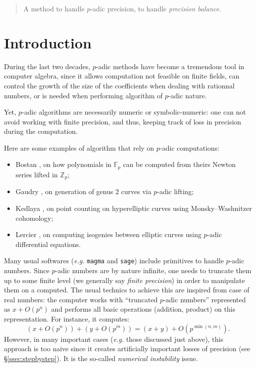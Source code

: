 \documentclass{amsart}
\begin{document}
\date{november 2013}

\maketitle
\begin{abstract}
A method to handle $p$-adic precision, to handle \textit{precision balance}.
\end{abstract}




\section{Introduction}

During the last two decades, $p$-adic methods have become a tremendous tool in computer algebra, since it allows computation not feasible on finite fields, can control the growth of the size of the coefficients when dealing with rationnal numbers, or is needed when performing algorithm of $p$-adic nature.

Yet, $p$-adic algorithms are necessarily numeric or symbolic-numeric: one can not avoid working with finite precision, and thus, keeping track of loss in precision during the computation.

Here are some examples of algorithm that rely on $p$-adic computations:
\begin{itemize}
\item Bostan \cite{Bostan}, on how polynomials in $\mathbb{F}_p$ can be computed from theirs Newton series lifted in $\mathbb{Z}_p$;
\item Gaudry \cite{Gaudry}, on generation of genus $2$ curves via $p$-adic lifting;
\item Kedlaya \cite{Kedlaya}, on point counting on hyperelliptic curves using Monsky--Washnitzer cohomology;
\item Lercier \cite{Lercier}, on computing isogenies between elliptic curves using $p$-adic differential equations.
\end{itemize}

Many usual softwares (\emph{e.g.} {\tt magma} and {\tt sage}) include 
primitives to handle $p$-adic numbers. Since $p$-adic numbers are by 
nature infinite, one needs to truncate them up to some finite level (we 
generally say \emph{finite precision}) in order to manipulate them on a 
computed. The usual technics to achieve this are inspired from case of 
real numbers: the computer works with ``truncated $p$-adic numbers'' 
represented as $x + O(p^n)$ and performs all basic operations (addition, 
product) on this representation. For instance, it computes: 
$$(x + O(p^n)) + (y + O(p^m)) = (x+y) + O(p^{\min(n,m)}).$$
However, in many important cases (\emph{e.g.} those discussed just 
above), this approach is too naive since it creates artificially 
important losses of precision (see \S\ref{ssec:stepbystep}). 
It is the so-called \emph{numerical instability} issue.
\end{document}
